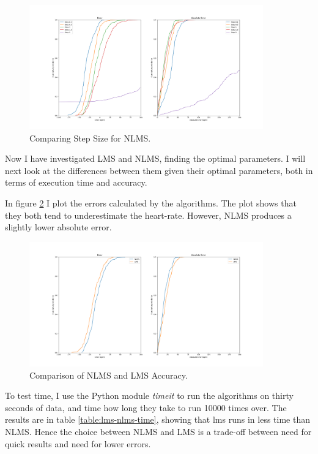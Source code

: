 \documentclass[12pt,a4paper,twoside,openany]{report}
\begin{document}
\begin{figure}[H]
	\centerline{\includegraphics[width=0.9\textwidth]{figs/nlms-steps-error-medium-noise.png}}
	\caption{Comparing Step Size for NLMS.}
	\label{fig:nlms-medium-step}
\end{figure}

Now I have investigated LMS and NLMS, finding the optimal parameters. I
will next look at the differences between them given their optimal
parameters, both in terms of execution time and accuracy.

In figure \ref{fig:lms-nlms-validity} I plot the errors calculated by the
algorithms. The plot shows that they both tend to underestimate the
heart-rate. However, NLMS produces a slightly lower absolute error. 

\begin{figure}[H]
	\centerline{\includegraphics[width=0.9\textwidth]{figs/nlms-lms-validity.png}}
	\caption{Comparison of NLMS and LMS Accuracy.}
	\label{fig:lms-nlms-validity}
\end{figure}

To test time, I use the Python module \emph{timeit} to run the algorithms on
thirty seconds of data, and time how long they take to run 10000 times over.
The results are in table \ref{table:lms-nlms-time}, showing that lms runs in
less time than NLMS. Hence the choice between NLMS and LMS is a trade-off
between need for quick results and need for lower errors.
\end{document}
